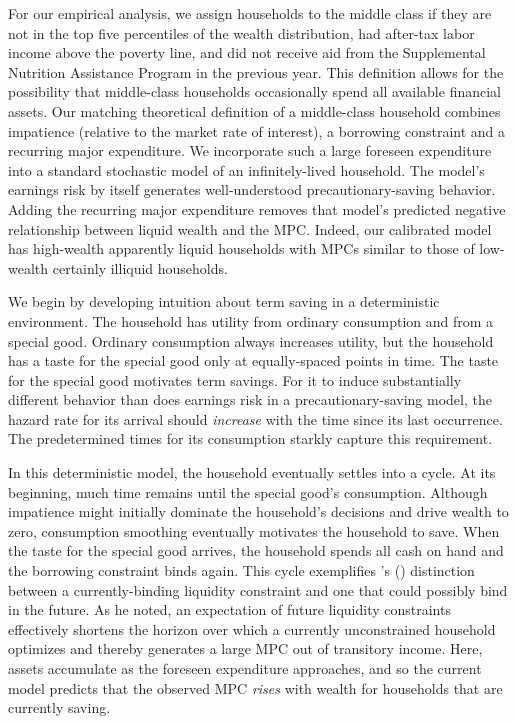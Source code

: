 \documentclass[fleqccn,12pt]{article}
\newcommand{\cites}[1]{\citeauthor{#1}'s (\citeyear{#1})}
\begin{document}
For our empirical analysis, we assign households to the middle class if they are not in the top five percentiles of the wealth distribution, had after-tax labor income above the poverty line, and did not receive aid from the Supplemental Nutrition Assistance Program in the previous year. This definition allows for the possibility that middle-class households occasionally spend all available financial assets. Our matching theoretical definition of a middle-class household combines impatience (relative to the market rate of interest), a borrowing constraint and a recurring major expenditure. We incorporate such a large foreseen expenditure into a standard stochastic model of an infinitely-lived household. The model's earnings risk by itself generates well-understood precautionary-saving behavior. Adding the recurring major expenditure removes that model's predicted negative relationship between liquid wealth and the MPC. Indeed, our calibrated model has high-wealth apparently liquid households with MPCs similar to those of low-wealth certainly illiquid households. 

We begin by developing intuition about term saving in a deterministic environment. The household has utility from ordinary consumption and from a special good. Ordinary consumption always increases utility, but the household has a taste for the special good only at equally-spaced points in time. The taste for the special good motivates term savings. For it to induce substantially different behavior than does earnings risk in a precautionary-saving model, the hazard rate for its arrival should \emph{increase} with the time since its last occurrence. The predetermined times for its consumption starkly capture this requirement.  

In this deterministic model, the household eventually settles into a cycle. At its beginning, much time remains until the special good's consumption. Although impatience might initially dominate the household's decisions and drive wealth to zero, consumption smoothing eventually motivates the household to save. When the taste for the special good arrives, the household spends all cash on hand and the borrowing constraint binds again. This cycle exemplifies \cites{mit1984Zeldes} distinction between a currently-binding liquidity constraint and one that could possibly bind in the future.  As he noted, an expectation of future liquidity constraints effectively shortens the horizon over which a currently unconstrained household optimizes and thereby generates a large MPC out of transitory income. Here, assets accumulate as the foreseen expenditure approaches, and so the current model predicts that the observed MPC \emph{rises} with wealth for households that are currently saving.
\end{document}
